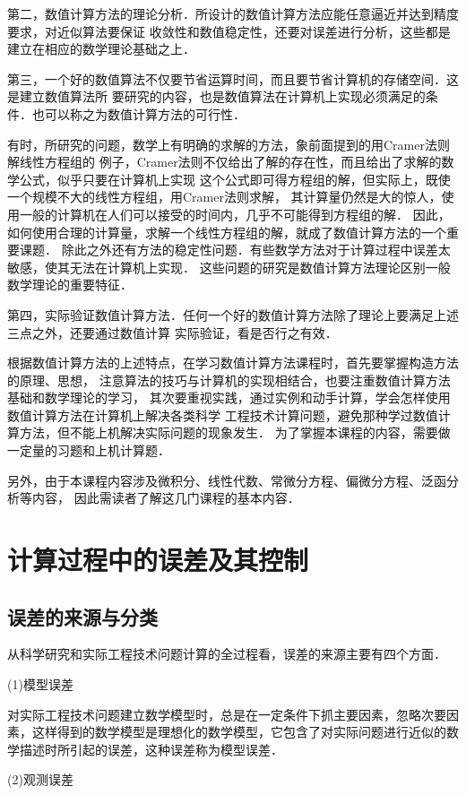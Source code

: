 第二，数值计算方法的理论分析．所设计的数值计算方法应能任意逼近并达到精度要求，对近似算法要保证
收敛性和数值稳定性，还要对误差进行分析，这些都是建立在相应的数学理论基础之上．

第三，一个好的数值算法不仅要节省运算时间，而且要节省计算机的存储空间．这是建立数值算法所
要研究的内容，也是数值算法在计算机上实现必须满足的条件．也可以称之为数值计算方法的可行性．

有时，所研究的问题，数学上有明确的求解的方法，象前面提到的用Cramer法则解线性方程组的
例子，Cramer法则不仅给出了解的存在性，而且给出了求解的数学公式，似乎只要在计算机上实现
这个公式即可得方程组的解，但实际上，既使一个规模不大的线性方程组，用Cramer法则求解，
其计算量仍然是大的惊人，使用一般的计算机在人们可以接受的时间内，几乎不可能得到方程组的解．
因此，如何使用合理的计算量，求解一个线性方程组的解，就成了数值计算方法的一个重要课题．
除此之外还有方法的稳定性问题．有些数学方法对于计算过程中误差太敏感，使其无法在计算机上实现．
这些问题的研究是数值计算方法理论区别一般数学理论的重要特征．

第四，实际验证数值计算方法．任何一个好的数值计算方法除了理论上要满足上述三点之外，还要通过数值计算
实际验证，看是否行之有效．

根据数值计算方法的上述特点，在学习数值计算方法课程时，首先要掌握构造方法的原理、思想，
注意算法的技巧与计算机的实现相结合，也要注重数值计算方法基础和数学理论的学习，
其次要重视实践，通过实例和动手计算，学会怎样使用数值计算方法在计算机上解决各类科学
工程技术计算问题，避免那种学过数值计算方法，但不能上机解决实际问题的现象发生．
为了掌握本课程的内容，需要做一定量的习题和上机计算题．

另外，由于本课程内容涉及微积分、线性代数、常微分方程、偏微分方程、泛函分析等内容，
因此需读者了解这几门课程的基本内容．

\section{计算过程中的误差及其控制}
\subsection{误差的来源与分类}
从科学研究和实际工程技术问题计算的全过程看，误差的来源主要有四个方面．

(1)模型误差

对实际工程技术问题建立数学模型时，总是在一定条件下抓主要因素，忽略次要因素，这样得到的数学模型是理想化的数学模型，它包含了对实际问题进行近似的数学描述时所引起的误差，这种误差称为模型误差．

(2)观测误差

